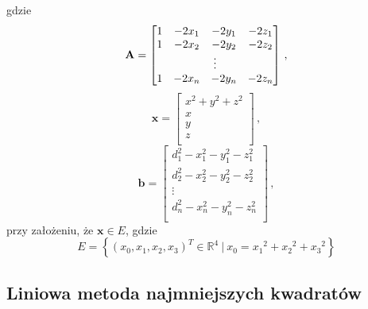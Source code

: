 gdzie
\begin{equation}
    \mathbf{A} =
    \left[
        \begin{matrix}
            1 & -2x_1 & -2y_1 & -2z_1  \\
            1 & -2x_2 & -2y_2 & -2z_2  \\
            \multicolumn{4}{c}{\vdots} \\
            1 & -2x_n & -2y_n & -2z_n  \\
        \end{matrix}
        \right]\,,
\end{equation}
\begin{equation}
    \mathbf{x} =
    \left[
        \begin{matrix}
            x^2 + y^2 + z^2 \\
            x               \\
            y               \\
            z               \\
        \end{matrix}
        \right]\,,
\end{equation}
\begin{equation}
    \mathbf{b} =
    \left[
        \begin{matrix}
            d_1^2 - x_1^2 - y_1^2 - z_1^2 \\
            d_2^2 - x_2^2 - y_2^2 - z_2^2 \\
            \vdots                        \\
            d_n^2 - x_n^2 - y_n^2 - z_n^2 \\
        \end{matrix}
    \right]\,,
\end{equation}
\noindent
przy założeniu, że $\mathbf{x} \in E$, gdzie
\begin{equation}
    E = \left\{(x_0, x_1, x_2, x_3)^T \in {\mathbb{R}}^4\ |\ x_0 = {x_1}^2 + {x_2}^2 + {x_3}^2\right\}
    \label{eq:constraint}
\end{equation}

\subsection{Liniowa metoda najmniejszych kwadratów}

